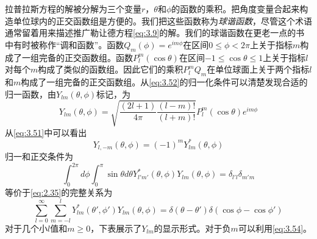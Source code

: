 \documentclass[12pt]{book}
\numberwithin{equation}{chapter}
\numberwithin{figure}{chapter}
\numberwithin{footnote}{page}
\begin{document}
拉普拉斯方程的解被分解为三个变量$r$，$\theta$和$\phi$的函数的乘积。把角度变量合起来构造单位球内的正交函数组是方便的。我们把这些函数称为\textit{球谐函数}，尽管这个术语通常留着用来描述推广勒让德方程\autoref{eq:3.9}的解。我们的球谐函数在更老一点的书中有时被称作“调和函数”。函数$Q_m(\phi)=e^{im\phi}$在区间$0\leq\phi<2\pi$上关于指标$m$构成了一组完备的正交函数组。函数$P_l^m(\cos\theta)$在区间$-1\leq\cos\theta\leq1$上关于指标$l$对每个$m$构成了类似的函数组。因此它们的乘积$P_l^mQ_m$在单位球面上关于两个指标$l$和$m$构成了一组完备的正交函数组。从\autoref{eq:3.52}的归一化条件可以清楚发现合适的归一函数，由$Y_{lm}(\theta,\phi)$标记，为
\begin{equation}\label{eq:3.53}
    Y_{lm}(\theta,\phi)=\sqrt{\frac{(2l+1)}{4\pi}\frac{(l-m)!}{(l+m)!}}P_l^m(\cos\theta)e^{im\phi}
\end{equation}
从\autoref{eq:3.51}中可以看出
\begin{equation}\label{eq:3.54}
    Y_{l,-m}(\theta,\phi)=(-1)^mY_{lm}^*(\theta,\phi)
\end{equation}
归一和正交条件为
\begin{equation}\label{eq:3.55}
    \int_{0}^{2\pi}d\phi \int_{0}^{\pi}\sin\theta d\theta Y_{l'm'}^*(\theta,\phi)Y_{lm}(\theta,\phi)=\delta_{l'l}\delta_{m'm}
\end{equation}
等价于\autoref{eq:2.35}的完整关系为
\begin{equation}\label{eq:3.56}
    \sum_{l=0}^\infty\sum_{m=-l}^l Y_{lm}^*(\theta',\phi')Y_{lm}(\theta,\phi)=\delta(\theta-\theta')\delta(\cos\phi-\cos\phi')
\end{equation}
对于几个小$l$值和$m\geq0$，下表展示了$Y_{lm}$的显示形式。对于负$m$可以利用\autoref{eq:3.54}。
\end{document}
